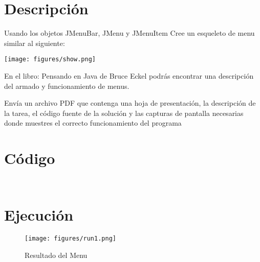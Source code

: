 \documentclass[12pt]{article}
\author{Pablo Vargas Bermúdez}
\begin{document}
\pagestyle{empty}



\section*{Descripción}
Usando los objetos JMenuBar, JMenu y JMenuItem Cree un esqueleto de
menu similar al siguiente:

\begin{center}
  \texttt{[image: figures/show.png]}
\end{center}

En el libro: Pensando en Java de Bruce Eckel podrás encontrar una
descripción del armado y funcionamiento de menus.

Envía un archivo PDF que contenga una hoja de presentación, la
descripción de la tarea, el código fuente de la solución y las
capturas de pantalla necesarias donde muestres el correcto
funcionamiento del programa

\section*{Código}
\inputminted{Java}{Gui.java}
\inputminted{Java}{Prueba.java}

\section*{Ejecución}
\begin{figure}[ht]
  \centering
  \texttt{[image: figures/run1.png]}
  \caption{Resultado del Menu}
\end{figure}
\end{document}
